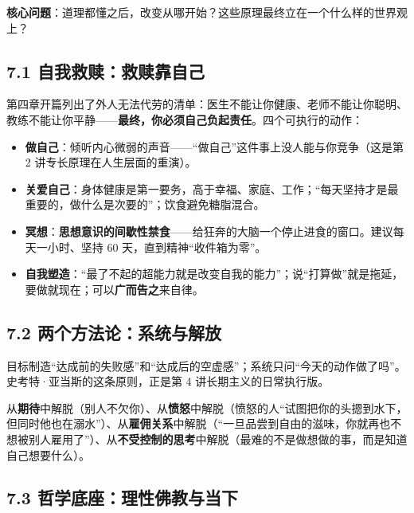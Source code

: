 \documentclass[UTF8,a4paper,11pt]{ctexart}
\begin{document}
\textbf{核心问题}：道理都懂之后，改变从哪开始？这些原理最终立在一个什么样的世界观上？

\subsection*{7.1 自我救赎：救赎靠自己}

第四章开篇列出了外人无法代劳的清单：医生不能让你健康、老师不能让你聪明、教练不能让你平静——\textbf{最终，你必须自己负起责任}。四个可执行的动作：

\begin{itemize}
  \item \textbf{做自己}：倾听内心微弱的声音——“做自己”这件事上没人能与你竞争（这是第 2 讲专长原理在人生层面的重演）。
  \item \textbf{关爱自己}：身体健康是第一要务，高于幸福、家庭、工作；“每天坚持才是最重要的，做什么是次要的”；饮食避免糖脂混合。
  \item \textbf{冥想}：\textbf{思想意识的间歇性禁食}——给狂奔的大脑一个停止进食的窗口。建议每天一小时、坚持 60 天，直到精神“收件箱为零”。
  \item \textbf{自我塑造}：“最了不起的超能力就是改变自我的能力”；说“打算做”就是拖延，要做就现在；可以\textbf{广而告之}来自律。
\end{itemize}

\subsection*{7.2 两个方法论：系统与解放}

\begin{keyconcept}
目标制造“达成前的失败感”和“达成后的空虚感”；系统只问“今天的动作做了吗”。史考特·亚当斯的这条原则，正是第 4 讲长期主义的日常执行版。
\end{keyconcept}

\begin{keyconcept}[四个解脱]
从\textbf{期待}中解脱（别人不欠你）、从\textbf{愤怒}中解脱（愤怒的人“试图把你的头摁到水下，但同时他也在溺水”）、从\textbf{雇佣关系}中解脱（“一旦品尝到自由的滋味，你就再也不想被别人雇用了”）、从\textbf{不受控制的思考}中解脱（最难的不是做想做的事，而是知道自己想要什么）。
\end{keyconcept}

\subsection*{7.3 哲学底座：理性佛教与当下}
\end{document}
